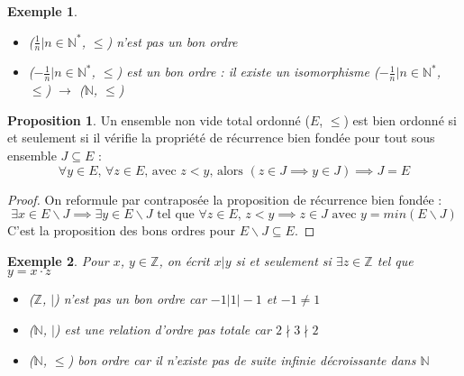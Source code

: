 \documentclass{article}
\theoremstyle{definition}
\theoremstyle{definition}
\newtheorem{prop}{Proposition}
\theoremstyle{definition}
\theoremstyle{plain}
\newtheorem{example}{Exemple}
\theoremstyle{theorem}
\theoremstyle{theorem}
\begin{document}
\begin{example}
    \begin{itemize}
        \item (${\frac{1}{n} | n \in \mathbb{N}^*}$, $\leqslant$) n'est pas un bon ordre
        \item (${-\frac{1}{n} | n \in \mathbb{N}^*}$, $\leqslant$) est un bon ordre : il existe un isomorphisme (${-\frac{1}{n} | n \in \mathbb{N}^*}$, $\leqslant$) $\to$ ($\mathbb{N}$, $\leqslant$)
    \end{itemize}
\end{example}

\begin{prop}

    Un ensemble non vide total ordonné ($E$, $\leqslant$) est bien ordonné si et seulement si il vérifie la propriété de récurrence bien fondée pour tout sous ensemble $J \subseteq E$ :
    \begin{equation*}
        \forall y \in E \text{, } \forall z \in E \text{, avec } z < y \text{, alors } (z \in J \implies y \in J) \implies J = E
    \end{equation*}
	\noindent

\end{prop}

\begin{proof}

    On reformule par contraposée la proposition de récurrence bien fondée :
    \begin{equation*}
        \exists x \in E\backslash J \implies \exists y \in E\backslash J \text{ tel que } \forall z \in E \text{, } z < y \implies z \in J \text{ avec } y = min(E\backslash J)
    \end{equation*}
	\noindent
    C'est la proposition des bons ordres pour $E\backslash J \subseteq E$.

\end{proof}

\begin{example}
    Pour $x$, $y \in \mathbb{Z}$, on écrit $x | y$ si et seulement si $\exists z \in \mathbb{Z}$ tel que $y = x\cdot z$
    \begin{itemize}
        \item ($\mathbb{Z}$, $|$) n'est pas un bon ordre car $-1 | 1 | -1$ et $-1 \neq 1$
        \item ($\mathbb{N}$, $|$) est une relation d'ordre pas totale car $2 \nmid 3 \nmid 2$
        \item ($\mathbb{N}$, $\leqslant$) bon ordre car il n'existe pas de suite infinie décroissante dans $\mathbb{N}$
    \end{itemize}
\end{example}
\end{document}
